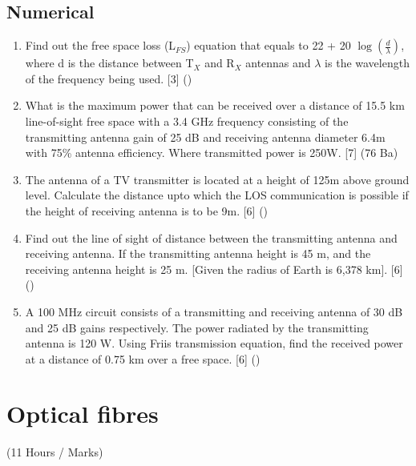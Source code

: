 \documentclass[12pt]{article}
\begin{document}
  \subsection{Numerical}
    \begin{enumerate}
      \item Find out the  free space loss (L$_{FS}$) equation that equals to 22 + 20 $\log(\frac{d}{\lambda})$, where d is the distance between T$_X$ and R$_X$ antennas and $\lambda$ is the wavelength of the frequency being used. \hfill [3] ()

      \item What is the maximum power that can be received over a distance of 15.5 km line-of-sight free space with a 3.4 GHz frequency consisting of the transmitting antenna gain of 25 dB and receiving antenna diameter 6.4m with 75\% antenna efficiency. Where transmitted power is 250W. \hfill [7] (76 Ba)

      \item The antenna of a TV transmitter is located at a height of 125m above ground level. Calculate the distance upto which the LOS communication is possible if the height of receiving antenna is to be 9m. \hfill [6] ()

      \item Find out the line of sight of distance between the transmitting antenna and receiving antenna. If the transmitting antenna height is 45 m, and the receiving antenna height is 25 m. [Given the radius of Earth is 6,378 km]. \hfill [6] ()

      \item A 100 MHz circuit consists of a transmitting and receiving antenna of 30 dB and 25 dB gains respectively. The power radiated by the transmitting antenna is 120 W. Using Friis transmission equation, find the received power at a distance of 0.75 km over a free space. \hfill [6] ()
    \end{enumerate}

\pagebreak

\section{Optical fibres}
  \begin{center} (11 Hours / Marks) \end{center}
  
\end{document}
